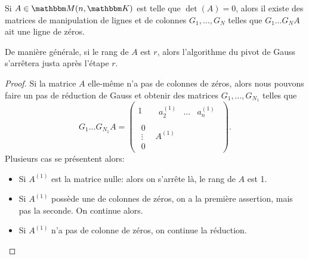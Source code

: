 \begin{proposition} \label{PROPooPMYCooAAtHsB}
    Si \( A\in \eM(n,\eK)\) est telle que \( \det(A)=0\), alors il existe des matrices de manipulation de lignes et de colonnes \( G_1,\ldots, G_N\) telles que \( G_1\ldots G_NA\) ait une ligne de zéros.
    
    De manière générale, si le rang de \( A \) est \( r \), alors l'algorithme du pivot de Gauss s'arrêtera justa après l'étape \( r \).
\end{proposition}

\begin{proof}
    Si la matrice \( A\) elle-même n'a pas de colonnes de zéros, alors nous pouvons faire un pas de réduction de Gauss et obtenir des matrices \( G_1,\ldots,  G_{N_1}\) telles que
    \begin{equation}
        G_1\ldots G_{N_1}A=
      \begin{pmatrix}
            1    &   \begin{matrix} 
                a^{(1)}_{2}    &   \ldots    &   a^{(1)}_n
            \end{matrix}\\ 
            \begin{matrix}
                0    \\ 
                \vdots    \\ 
                0    
            \end{matrix}& A^{(1)}
        \end{pmatrix}.
    \end{equation}
    Plusieurs cas se présentent alors:
    \begin{itemize}
    \item
      Si \( A^{(1)}\)  est la matrice nulle: alors on s'arrête là, le rang de \( A \) est 1.
    \item
      Si \( A^{(1)}\) possède une de colonnes de zéros, on a la première assertion, mais pas la seconde. On continue alors.
    \item
      Si \( A^{(1)}\) n'a pas de colonne de zéros, on continue la réduction.
    \end{itemize}
    

\end{proof}
